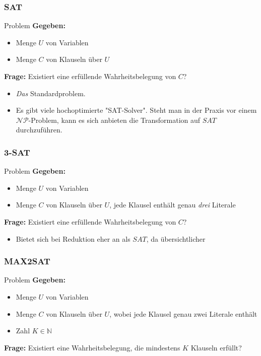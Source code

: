 \documentclass{beamer}
\begin{document}
{\begin{frame}
\frametitle{SAT}
\begin{block}{Problem}
\textbf{Gegeben:}
\begin{itemize}
 \item Menge $U$ von Variablen
 \item Menge $C$ von Klauseln über $U$
\end{itemize}
\textbf{Frage:} Existiert eine erfüllende Wahrheitsbelegung von $C$?
\end{block}
\begin{itemize}
\item \emph{Das} Standardproblem.
\item Es gibt viele hochoptimierte "SAT-Solver". Steht man in der Praxis vor einem $\mathcal{NP}$-Problem, kann es sich anbieten die Transformation auf $SAT$ durchzuführen.
\end{itemize}
\end{frame}
\begin{frame}
\frametitle{3-SAT}
\begin{block}{Problem}
\textbf{Gegeben:}
\begin{itemize}
 \item Menge $U$ von Variablen
 \item Menge $C$ von Klauseln über $U$, jede Klausel enthält genau \emph{drei} Literale
\end{itemize}
\textbf{Frage:} Existiert eine erfüllende Wahrheitsbelegung von $C$?
\end{block}
\begin{itemize}
\item Bietet sich bei Reduktion eher an als $SAT$, da übersichtlicher
\end{itemize}
\end{frame}
\begin{frame}
\frametitle{MAX2SAT}
\begin{block}{Problem}
\textbf{Gegeben:}
\begin{itemize}
 \item Menge $U$ von Variablen
 \item Menge $C$ von Klauseln über $U$, wobei jede Klausel genau zwei Literale enthält
 \item Zahl $K \in \mathbb{N}$
\end{itemize}
\textbf{Frage:} Existiert eine Wahrheitsbelegung, die mindestens $K$ Klauseln erfüllt?
\end{block}
\end{frame}
\begin{frame}

\end{frame}}
\end{document}
